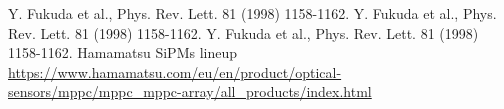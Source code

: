 \documentclass[a4paper,11pt,titlepage]{book}	%
\begin{document}
	
	\begin{frontespizio}
		\Punteggiatura{}
	\end{frontespizio}
	
	\begin{frontmatter}
		\tableofcontents
		
		
		
	\end{frontmatter}
	
	\begin{mainmatter}
		
		
		
		
		
		
		

		
		
		
		
	\end{mainmatter}
	
	\begin{backmatter}
		
		
		\begin{thebibliography}{99}
			
			
			 Y. Fukuda et al., Phys. Rev. Lett. 81 (1998) 1158-1162.
			 Y. Fukuda et al., Phys. Rev. Lett. 81 (1998) 1158-1162.
			 Y. Fukuda et al., Phys. Rev. Lett. 81 (1998) 1158-1162.
			 Hamamatsu SiPMs lineup \url{https://www.hamamatsu.com/eu/en/product/optical-sensors/mppc/mppc_mppc-array/all_products/index.html}		
		\end{thebibliography}
		
	\end{backmatter}
	
	
\end{document}
